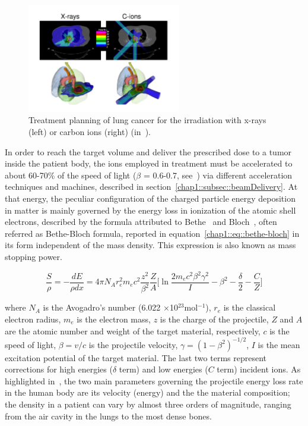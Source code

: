 \begin{figure}[!htbp]
\centering
\includegraphics[width=0.6\textwidth]{03_GraphicFiles/chapter1_Introduction/xRayCions_fields.pdf}
\caption{Treatment planning of lung cancer for the irradiation with x-rays (left) or carbon ions (right) (in~\cite{Durante2016}).}
\label{chap1::fig::XraysCionsFields}
\end{figure} 

In order to reach the target volume and deliver the prescribed dose to a tumor inside the patient body, the ions employed in treatment must be accelerated to about 60-70\% of the speed of light ($\beta$ = 0.6-0.7, see~\cite{Durante2016}) via different acceleration techniques and machines, described in section~\ref{chap1::subsec::beamDelivery}. At that energy, the peculiar configuration of the charged particle energy deposition in matter is mainly governed by the energy loss in ionization of the atomic shell electrons, described by the formula attributed to Bethe~\parencite{Bethe1930} and Bloch~\parencite{Bloch1933}, often referred as Bethe-Bloch formula, reported in equation~\ref{chap1::eq::bethe-bloch} in its form independent of the mass density. This expression is also known as mass stopping power.

\begin{equation}
\frac{S}{\rho} = -\frac{dE}{\rho dx} = 4\pi N_{A}r^{2}_{e}m_{e}c^{2}\frac{z^{2}}{\beta^{2}}\frac{Z}{A}\bigg[\ln{\frac{2m_{e}c^{2}\beta^{2}\gamma^{2}}{I}}-\beta^{2}-\frac{\delta}{2}-\frac{C}{Z}\bigg]
\label{chap1::eq::bethe-bloch}
\end{equation}

where $N_{A}$ is the Avogadro's number (6.022 $\times$10$^{23}$mol$^{-1}$), $r_{e}$ is the classical electron radius, $m_{e}$ is the electron mass, $z$ is the charge of the projectile, $Z$ and $A$ are the atomic number and weight of the target material, respectively, $c$ is the speed of light, $\beta = v/c$ is the projectile velocity, $\gamma = (1-\beta^{2})^{-1/2}$, $I$ is the mean excitation potential of the target material. The last two terms represent corrections for high energies ($\delta$ term) and low energies ($C$ term) incident ions. As highlighted in~\cite{Newhauser2015}, the two main parameters governing the projectile energy loss rate in the human body are its velocity (energy) and the the material composition; the density in a patient can vary by almost three orders of magnitude, ranging from the air cavity in the lungs to the most dense bones. 

